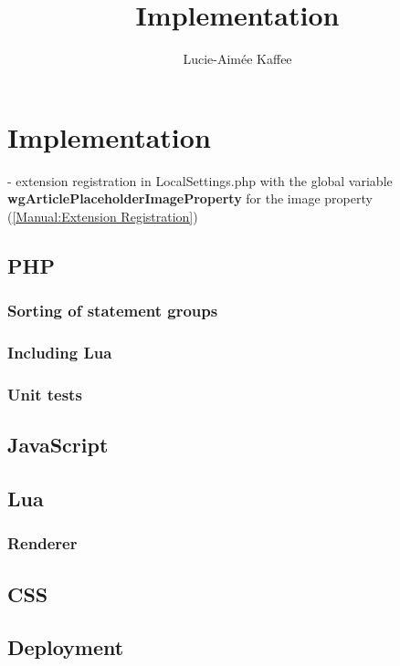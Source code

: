 \documentclass[11pt]{article}
\title {{Implementation}}
\author {Lucie-Aim\'{e}e Kaffee}
\date{}
\begin{document}
	\linenumbers
	\section{Implementation}
	
	- extension registration in LocalSettings.php with the global variable \textbf{wgArticlePlaceholderImageProperty} for the image property (\href{https://www.mediawiki.org/wiki/Manual:Extension_registration}{[Manual:Extension Registration]})\\
	
	
	\newpage
	\subsection{PHP}
	
	
	\newpage
	\subsubsection{Sorting of statement groups}
	\subsubsection{Including Lua}
	\subsubsection{Unit tests}
	\subsection{JavaScript}
	\subsection{Lua}
	\subsubsection{Renderer}
	
	\newpage
	\subsection{CSS}
	\subsection{Deployment}
	
\end{document}
